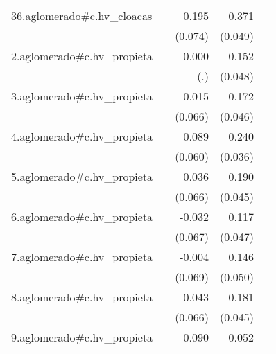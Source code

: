 {\begin{longtable}{l*{4}{D{.}{.}{-1}}}
\addlinespace
36.aglomerado#c.hv\_cloacas&                     &       0.195\sym{**} &       0.371\sym{***}&                     \\
            &                     &     (0.074)         &     (0.049)         &                     \\
\addlinespace
2.aglomerado#c.hv\_propieta&                     &       0.000         &       0.152\sym{**} &                     \\
            &                     &         (.)         &     (0.048)         &                     \\
\addlinespace
3.aglomerado#c.hv\_propieta&                     &       0.015         &       0.172\sym{***}&                     \\
            &                     &     (0.066)         &     (0.046)         &                     \\
\addlinespace
4.aglomerado#c.hv\_propieta&                     &       0.089         &       0.240\sym{***}&                     \\
            &                     &     (0.060)         &     (0.036)         &                     \\
\addlinespace
5.aglomerado#c.hv\_propieta&                     &       0.036         &       0.190\sym{***}&                     \\
            &                     &     (0.066)         &     (0.045)         &                     \\
\addlinespace
6.aglomerado#c.hv\_propieta&                     &      -0.032         &       0.117\sym{*}  &                     \\
            &                     &     (0.067)         &     (0.047)         &                     \\
\addlinespace
7.aglomerado#c.hv\_propieta&                     &      -0.004         &       0.146\sym{**} &                     \\
            &                     &     (0.069)         &     (0.050)         &                     \\
\addlinespace
8.aglomerado#c.hv\_propieta&                     &       0.043         &       0.181\sym{***}&                     \\
            &                     &     (0.066)         &     (0.045)         &                     \\
\addlinespace
9.aglomerado#c.hv\_propieta&                     &      -0.090         &       0.052         &                     \\

\end{longtable}}
